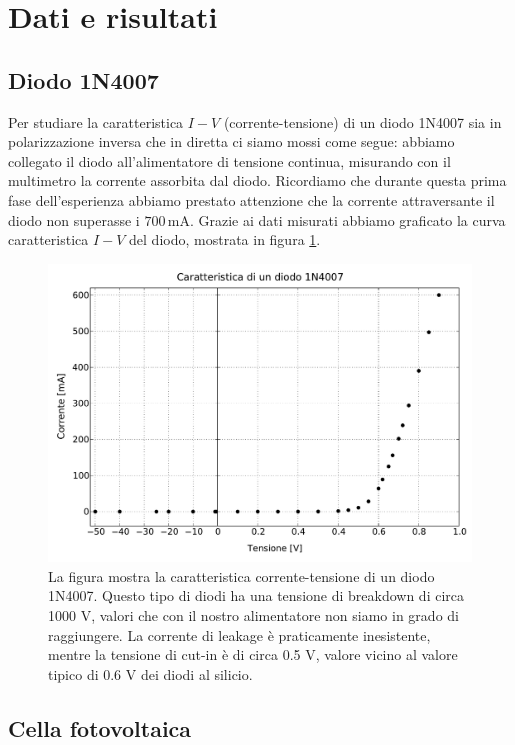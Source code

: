 \section*{Dati e risultati}

\subsection*{Diodo 1N4007}

Per studiare la caratteristica $I-V$ (corrente-tensione) di un diodo 1N4007 sia in polarizzazione inversa che in diretta ci siamo mossi come segue: abbiamo collegato il diodo all'alimentatore di tensione continua, misurando con il multimetro la corrente assorbita dal diodo.
Ricordiamo che durante questa prima fase dell'esperienza abbiamo prestato attenzione che la corrente attraversante il diodo non superasse i $700\,\si{\milli\ampere}$. Grazie ai dati misurati abbiamo graficato la curva caratteristica $I-V$ del diodo, mostrata in figura \ref{fig:diodo}.

\begin{figure}
    \includegraphics[scale=0.50]{diodo.pdf}
    \caption{La figura mostra la caratteristica corrente-tensione di un diodo 1N4007. Questo tipo di diodi
        ha una tensione di breakdown di circa 1000 V, valori che con il nostro alimentatore non siamo in grado di raggiungere.
        La corrente di leakage è praticamente inesistente, mentre la tensione di cut-in è di circa 0.5 V, valore vicino al valore
        tipico di 0.6 V dei diodi al silicio. }
    \label{fig:diodo}
\end{figure}

\subsection*{Cella fotovoltaica}

